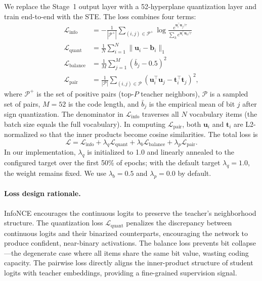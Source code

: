 \documentclass[11pt,a4paper]{article}
\begin{document}
We replace the Stage~1 output layer with a 52-hyperplane quantization layer and train end-to-end with the STE. The loss combines four terms:
\begin{align}
    \mathcal{L}_{\text{info}} &= -\frac{1}{|\mathcal{P}^+|}\sum_{(i,j) \in \mathcal{P}^+} \log \frac{e^{\mathbf{u}_i^\top \mathbf{u}_j / \tau}}{\sum_{k} e^{\mathbf{u}_i^\top \mathbf{u}_k / \tau}} \\
    \mathcal{L}_{\text{quant}} &= \frac{1}{N} \sum_{i=1}^{N} \| \mathbf{u}_i - \mathbf{b}_i \|_1 \\
    \mathcal{L}_{\text{balance}} &= \frac{1}{M} \sum_{j=1}^{M} \left( \bar{b}_j - 0.5 \right)^2 \\
    \mathcal{L}_{\text{pair}} &= \frac{1}{|\mathcal{P}|} \sum_{(i,j) \in \mathcal{P}} \left( \mathbf{u}_i^\top \mathbf{u}_j - \mathbf{t}_i^\top \mathbf{t}_j \right)^2,
\end{align}
where $\mathcal{P}^+$ is the set of positive pairs (top-$P$ teacher neighbors), $\mathcal{P}$ is a sampled set of pairs, $M=52$ is the code length, and $\bar{b}_j$ is the empirical mean of bit $j$ after sign quantization. The denominator in $\mathcal{L}_{\text{info}}$ traverses all $N$ vocabulary items (the batch size equals the full vocabulary). In computing $\mathcal{L}_{\text{pair}}$, both $\mathbf{u}_i$ and $\mathbf{t}_i$ are L2-normalized so that the inner products become cosine similarities. The total loss is
\begin{equation}
    \mathcal{L} = \mathcal{L}_{\text{info}} + \lambda_q \mathcal{L}_{\text{quant}} + \lambda_b \mathcal{L}_{\text{balance}} + \lambda_p \mathcal{L}_{\text{pair}}.
\end{equation}
In our implementation, $\lambda_q$ is initialized to 1.0 and linearly annealed to the configured target over the first 50\% of epochs; with the default target $\lambda_q=1.0$, the weight remains fixed. We use $\lambda_b=0.5$ and $\lambda_p=0.0$ by default.

\paragraph{Loss design rationale.} InfoNCE encourages the continuous logits to preserve the teacher's neighborhood structure. The quantization loss $\mathcal{L}_{\text{quant}}$ penalizes the discrepancy between continuous logits and their binarized counterparts, encouraging the network to produce confident, near-binary activations. The balance loss prevents bit collapse---the degenerate case where all items share the same bit value, wasting coding capacity. The pairwise loss directly aligns the inner-product structure of student logits with teacher embeddings, providing a fine-grained supervision signal.
\end{document}
